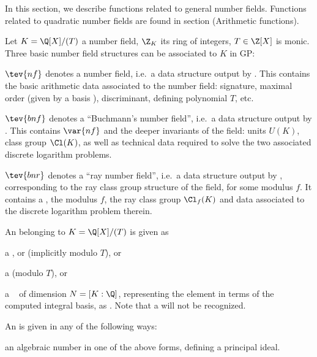 In this section, we describe functions related to general number fields.
Functions related to quadratic number fields are found in
section  (Arithmetic functions).


Let $K = \Q[X] / (T)$ a number field, $\Z_K$ its ring of integers, $T\in\Z[X]$
is monic. Three basic number field structures can be associated to $K$ in
GP:

\item $\tev{nf}$ denotes a number field, i.e.~a data structure output by
. This contains the basic arithmetic data associated to the
number field: signature, maximal order (given by a basis ),
discriminant, defining polynomial $T$, etc.

\item $\tev{bnf}$ denotes a ``Buchmann's number field'', i.e.~a
data structure output by . This contains
$\var{nf}$ and the deeper invariants of the field: units $U(K)$, class group
$\Cl(K)$, as well as technical data required to solve the two associated
discrete logarithm problems.

\item $\tev{bnr}$ denotes a ``ray number field'', i.e.~a data structure
output by , corresponding to the ray class group structure of
the field, for some modulus $f$. It contains a , the modulus
$f$, the ray class group $\Cl_f(K)$ and data associated to
the discrete logarithm problem therein.


\noindent An  belonging to $K = \Q[X]/(T)$ is given as

\item a ,  or  (implicitly modulo $T$), or

\item a  (modulo $T$), or

\item a ~ of dimension $N = [K:\Q]$, representing
the element in terms of the computed integral basis, as
. Note that a 
will not be recognized.
\medskip

\noindent An  is given in any of the following ways:

\item an algebraic number in one of the above forms, defining a principal ideal.

